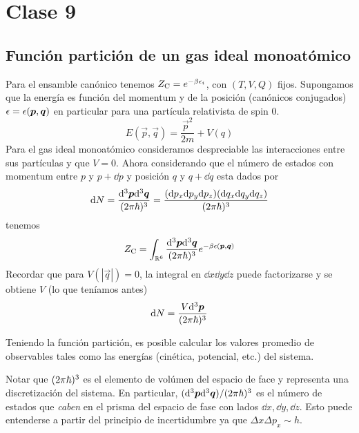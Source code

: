 \section{Clase 9}
\subsection{Función partición de un gas ideal monoatómico}
Para el ensamble canónico tenemos $Z_{\rm C}=e^{-\beta \epsilon_i}$, con $(T,V,Q)$ fijos. Supongamos que la energía es función del momentum y de la posición (canónicos conjugados) $\epsilon=\epsilon(\vb*{p},\vb*{q})$ en particular para una partícula relativista de spin $0$.
\begin{equation}
  E(\vec{p},\vec{q})=\frac{\vec{p}^2}{2m}+V(q)
\end{equation}
Para el gas ideal monoatómico consideramos despreciable las interacciones entre sus partículas y que $V=0$. Ahora considerando que el número de estados con momentum entre $p$ y $p+\dd p$ y posición $q$ y $q+\dd q$ esta dados por
\begin{equation}
  \dd N=\frac{\dd^3\vb*{p}\dd^3\vb*{q}}{(2\pi\hbar)^3}=\frac{(\dd p_x\dd p_y\dd p_z)(\dd q_x\dd q_y\dd q_z)}{(2\pi\hbar)^3}
\end{equation}
tenemos
\begin{equation}
  Z_{\rm C}=\int_{\mathbb{R}^6}\frac{\dd^3\vb*{p}\dd^3\vb*{q}}{(2\pi\hbar)^3}e^{-\beta\epsilon(\vb*{p},\vb*{q})}
\end{equation}
Recordar que para $V(|\vec{q}|)=0$, la integral en $\dd x\dd y\dd z$ puede factorizarse y se obtiene $V$ (lo que teníamos antes)
\begin{equation}
  \dd N=\frac{V\dd^3\vb*{p}}{(2\pi\hbar)^3}
\end{equation}

Teniendo la función partición, es posible calcular los valores promedio de observables tales como las energías (cinética, potencial, etc.) del sistema.

Notar que $(2\pi\hbar)^3$ es el elemento de volúmen del espacio de face y representa una discretización del sistema. En particular, $(\dd^3\vb*{p}\dd^3\vb*{q})/(2\pi\hbar)^3$ es el número de estados que \textit{caben} en el prisma del espacio de fase con lados $\dd x,\dd y,\dd z$. Esto puede entenderse a partir del principio de incertidumbre ya que $\Delta x\Delta p_x\sim h$.

